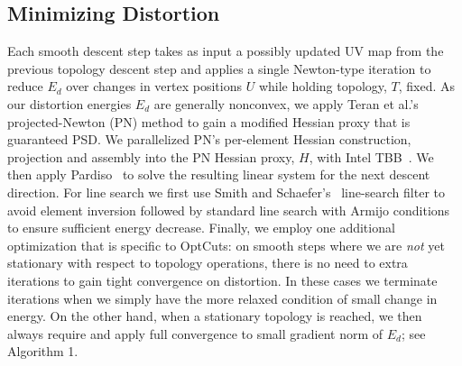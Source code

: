 \subsection{Minimizing Distortion}
\label{sec:descentStep}

Each smooth descent step takes as input a possibly updated UV map from the previous topology descent step and applies a single Newton-type iteration to reduce $E_d$ over changes in vertex positions $U$ while holding topology, $T$, fixed.
%
As our distortion energies $E_{d}$ are generally nonconvex, we apply Teran et al.'s\  projected-Newton (PN) method to gain a modified Hessian proxy that is guaranteed PSD. We parallelized PN's per-element Hessian construction,   projection and assembly into the PN Hessian proxy, $H$, with Intel TBB~\cite{Reinders2007Intel}.  We then apply Pardiso~\cite{pardiso-6.0a, pardiso-6.0b} to solve the resulting linear system for the next descent direction. For line search we first use Smith and Schaefer's~ line-search filter to avoid element inversion followed by standard line search with Armijo conditions~ to ensure sufficient energy decrease.  Finally, we employ one additional optimization that is specific to OptCuts: on smooth steps where we are \emph{not} yet stationary with respect to topology operations, there is no need to  extra iterations to gain tight convergence on distortion. In these cases we terminate iterations when we simply have the more relaxed condition of small change in energy. On the other hand, when a stationary topology is reached, we then always require and apply full convergence to small gradient norm of $E_d$; see Algorithm 1.


